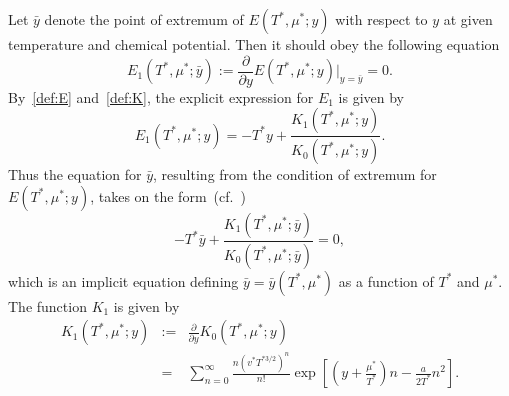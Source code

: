 \documentclass[12pt]{article}
\numberwithin{equation}{section}
\begin{document}
	Let $\bar{y}$ denote the point of extremum of $E(T^*,\mu^*;y)$ with respect to $y$ at given temperature and chemical potential. Then it should obey the following equation
	\begin{equation}
		\label{def:E1}
		E_1(T^*,\mu^*;\bar{y}) := \frac{\partial}{\partial y} E(T^*,\mu^*;y)\bigg|_{y=\bar{y}} = 0.
	\end{equation}
	By~\eqref{def:E} and~\eqref{def:K}, the explicit expression for $E_1$ is given by
	\begin{equation}
		\label{def:reducedE1}
		E_1(T^*,\mu^*;y) = -T^* y + \frac{K_1(T^*,\mu^*;y)}{K_0(T^*,\mu^*;y)}.
	\end{equation}
	Thus the equation for $\bar{y}$, resulting from the condition of extremum for $E(T^*,\mu^*;y)$, takes on the form~(cf.~\cite[(2.19)]{KKD20})
	\begin{equation}
		\label{eq:bar_y}
		-T^* \bar{y} + \frac{K_1(T^*,\mu^*;\bar{y})}{K_0(T^*,\mu^*;\bar{y})} = 0,
	\end{equation}
	which is an implicit equation defining $\bar{y} = \bar{y}(T^*,\mu^*)$ as a function of $T^*$ and $\mu^*$.
	The function $K_1$ is given by
	\begin{eqnarray}
		K_1(T^*,\mu^*;y) & := & \frac{\partial}{\partial y} K_0(T^*,\mu^*;y)
		\nonumber\\
		& = & \sum_{n=0}^{\infty} \frac{n (v^* T^{*3/2})^n}{n!} \exp[\left(y+\frac{\mu^*}{T^*}\right)n - \frac{a}{2T^*}n^2].
	\end{eqnarray}
	
\end{document}

